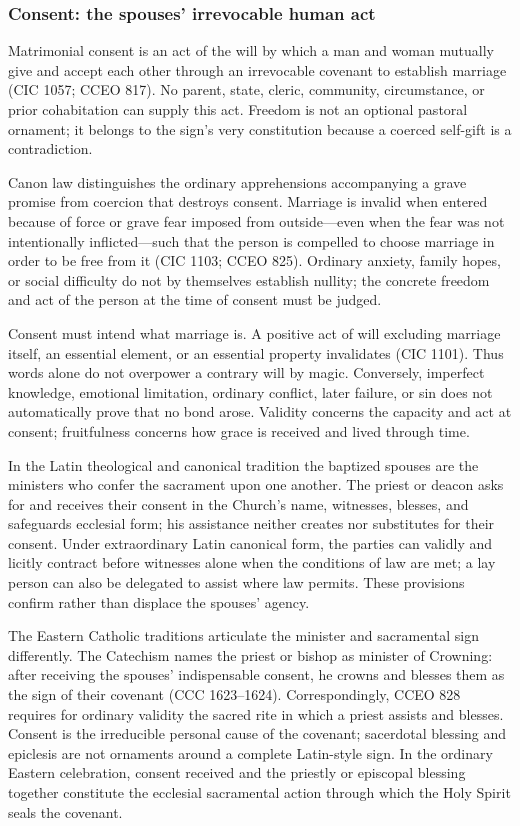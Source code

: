 \subsubsection{Consent: the spouses' irrevocable human act}

Matrimonial consent is an act of the will by which a man and woman mutually give and accept each other through an irrevocable covenant to establish marriage (CIC 1057; CCEO 817). No parent, state, cleric, community, circumstance, or prior cohabitation can supply this act. Freedom is not an optional pastoral ornament; it belongs to the sign's very constitution because a coerced self-gift is a contradiction.

Canon law distinguishes the ordinary apprehensions accompanying a grave promise from coercion that destroys consent. Marriage is invalid when entered because of force or grave fear imposed from outside---even when the fear was not intentionally inflicted---such that the person is compelled to choose marriage in order to be free from it (CIC 1103; CCEO 825). Ordinary anxiety, family hopes, or social difficulty do not by themselves establish nullity; the concrete freedom and act of the person at the time of consent must be judged.

Consent must intend what marriage is. A positive act of will excluding marriage itself, an essential element, or an essential property invalidates (CIC 1101). Thus words alone do not overpower a contrary will by magic. Conversely, imperfect knowledge, emotional limitation, ordinary conflict, later failure, or sin does not automatically prove that no bond arose. Validity concerns the capacity and act at consent; fruitfulness concerns how grace is received and lived through time.

In the Latin theological and canonical tradition the baptized spouses are the ministers who confer the sacrament upon one another. The priest or deacon asks for and receives their consent in the Church's name, witnesses, blesses, and safeguards ecclesial form; his assistance neither creates nor substitutes for their consent. Under extraordinary Latin canonical form, the parties can validly and licitly contract before witnesses alone when the conditions of law are met; a lay person can also be delegated to assist where law permits. These provisions confirm rather than displace the spouses' agency.

The Eastern Catholic traditions articulate the minister and sacramental sign differently. The Catechism names the priest or bishop as minister of Crowning: after receiving the spouses' indispensable consent, he crowns and blesses them as the sign of their covenant (CCC 1623--1624). Correspondingly, CCEO 828 requires for ordinary validity the sacred rite in which a priest assists and blesses. Consent is the irreducible personal cause of the covenant; sacerdotal blessing and epiclesis are not ornaments around a complete Latin-style sign. In the ordinary Eastern celebration, consent received and the priestly or episcopal blessing together constitute the ecclesial sacramental action through which the Holy Spirit seals the covenant.

